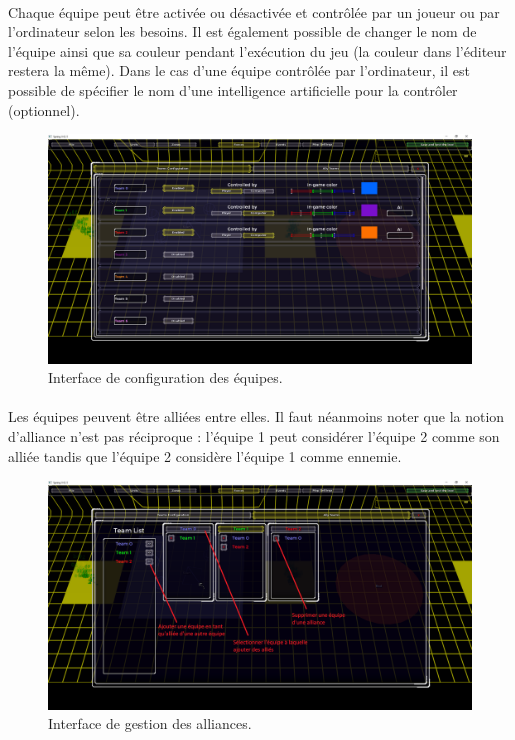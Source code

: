 \documentclass[a4paper]{article}
\begin{document}
\paragraph{ }
Chaque équipe peut être activée ou désactivée et contrôlée par un joueur ou par l'ordinateur selon les besoins. Il est également possible de changer le nom de l'équipe ainsi que sa couleur pendant l'exécution du jeu (la couleur dans l'éditeur restera la même). Dans le cas d'une équipe contrôlée par l'ordinateur, il est possible de spécifier le nom d'une intelligence artificielle pour la contrôler (optionnel).
\begin{figure}[H]
\centering
\includegraphics[width=\linewidth]{editor-teamconfig.png}
\caption{Interface de configuration des équipes.}
\label{fig:editor-teamconfig}
\end{figure}
\paragraph{ }
Les équipes peuvent être alliées entre elles. Il faut néanmoins noter que la notion d'alliance n'est pas réciproque : l'équipe 1 peut considérer l'équipe 2 comme son alliée tandis que l'équipe 2 considère l'équipe 1 comme ennemie.
\begin{figure}[H]
\centering
\includegraphics[width=\linewidth]{editor-allyteam.png}
\caption{Interface de gestion des alliances.}
\label{fig:editor-allyteam}
\end{figure}
\end{document}
